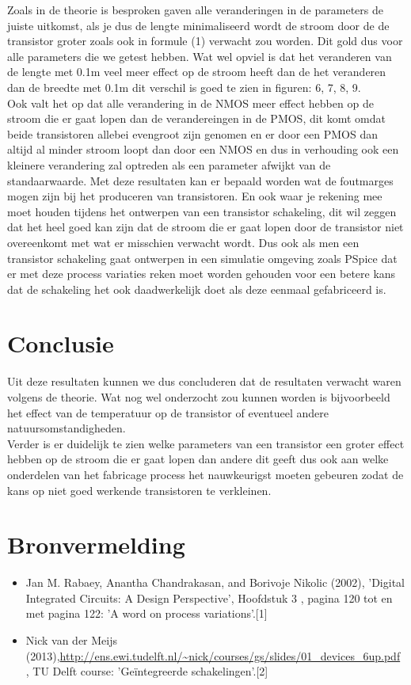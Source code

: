 \documentclass{article}
\begin{document}
Zoals in de theorie is besproken gaven alle veranderingen in de parameters de juiste uitkomst, als je dus de lengte minimaliseerd wordt de stroom door de de transistor groter zoals ook in formule (1) verwacht zou worden. Dit gold dus voor alle parameters die we getest hebben. Wat wel opviel is dat het veranderen van de lengte met 0.1\textmu m veel meer effect op de stroom heeft dan de het veranderen dan de breedte met 0.1\textmu m dit verschil is goed te zien in figuren: 6, 7, 8, 9.\\
Ook valt het op dat alle verandering in de NMOS meer effect hebben op de stroom die er gaat lopen dan de verandereingen in de PMOS, dit komt omdat beide transistoren allebei evengroot zijn genomen en er door een PMOS dan altijd al minder stroom loopt dan door een NMOS en dus in verhouding ook een kleinere verandering zal optreden als een parameter afwijkt van de standaarwaarde.
Met deze resultaten kan er bepaald worden wat de foutmarges mogen zijn bij het produceren van transistoren. En ook waar je rekening mee moet houden tijdens het ontwerpen van een transistor schakeling, dit wil zeggen dat het heel goed kan zijn dat de stroom die er gaat lopen door de transistor niet overeenkomt met wat er misschien verwacht wordt. Dus ook als men een transistor schakeling gaat ontwerpen in een simulatie omgeving zoals PSpice dat er met deze process variaties reken moet worden gehouden voor een betere kans dat de schakeling het ook daadwerkelijk doet als deze eenmaal gefabriceerd is.


\section{Conclusie}

Uit deze resultaten kunnen we dus concluderen dat de resultaten verwacht waren volgens de theorie. Wat nog wel onderzocht zou kunnen worden is bijvoorbeeld het effect van de temperatuur op de transistor of eventueel andere natuursomstandigheden.\\
Verder is er duidelijk te zien welke parameters van een transistor een groter effect hebben op de stroom die er gaat lopen dan andere  dit geeft dus ook aan welke onderdelen van het fabricage process het nauwkeurigst moeten gebeuren zodat de kans op niet goed werkende transistoren te verkleinen.

\section{Bronvermelding}

\begin{itemize}
	\item Jan M. Rabaey, Anantha Chandrakasan, and Borivoje Nikolic (2002), 'Digital Integrated Circuits: A Design Perspective', Hoofdstuk 3 , pagina 120 tot en met pagina 122: 'A word on process variations'.[1]
	\item Nick van der Meijs (2013),\url{http://ens.ewi.tudelft.nl/~nick/courses/gs/slides/01_devices_6up.pdf} , TU Delft course: 'Geïntegreerde schakelingen'.[2]
\end{itemize}
\end{document}
